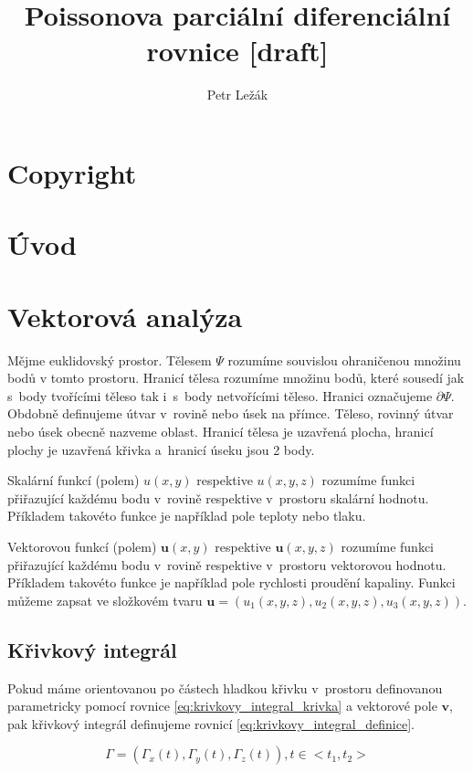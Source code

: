 \documentclass{book}
\title{Poissonova parciální diferenciální rovnice [draft]}
\author{Petr Ležák}
\newcommand{\vect}[1]{\boldsymbol{#1}}
\begin{document}
\maketitle

\section{Copyright}



\section{Úvod}

\section{Vektorová analýza}

Mějme euklidovský prostor. Tělesem \(\Psi\) rozumíme souvislou ohraničenou množinu bodů v tomto prostoru. Hranicí tělesa rozumíme množinu bodů, které sousedí jak s~body tvořícími těleso tak i~s~body netvořícími těleso. Hranici označujeme \(\partial \Psi\). Obdobně definujeme útvar v~rovině nebo úsek na přímce. Těleso, rovinný útvar nebo úsek obecně nazveme oblast. Hranicí tělesa je uzavřená plocha, hranicí plochy je uzavřená křivka a~hranicí úseku jsou 2 body. 

Skalární funkcí (polem) \(u(x, y)\) respektive \(u(x, y, z)\) rozumíme funkci přiřazující každému bodu v~rovině respektive v~prostoru skalární hodnotu. Příkladem takovéto funkce je například pole teploty nebo tlaku.


Vektorovou funkcí (polem) \(\vect{u}(x, y)\) respektive \(\vect{u}(x, y, z)\) rozumíme funkci přiřazující každému bodu v~rovině respektive v~prostoru vektorovou hodnotu. Příkladem takovéto funkce je například pole rychlosti proudění kapaliny. Funkci můžeme zapsat ve složkovém tvaru \(\vect{u}=(u_1(x, y, z), u_2(x, y, z), u_3(x, y, z))\).

\subsection{Křivkový integrál}
Pokud máme orientovanou po částech hladkou křivku v~prostoru definovanou parametricky pomocí rovnice \eqref{eq:krivkovy_integral_krivka} a vektorové pole \(\vect{v}\), pak křivkový integrál definujeme rovnicí \eqref{eq:krivkovy_integral_definice}.

\begin{equation}
\label{eq:krivkovy_integral_krivka}
\Gamma = (\Gamma_x(t), \Gamma_y(t), \Gamma_z(t)), t \in <t_1, t_2>
\end{equation}
\end{document}

